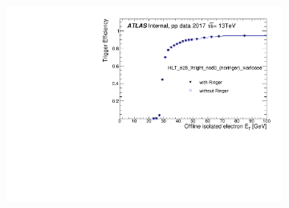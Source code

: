 \begin{figure}[h!tb]
  \begin{center}
  \begin{subfigure}[c]{.58\textwidth}
  \centering
  \includegraphics[width=\textwidth]{sections/04_operation/figures/efficiencies/eff_EGAM1_e28_ringer_and_noringer_2017_after_ts1_HLT_et.pdf}
  \caption{}%


\end{subfigure}
\end{center}
\end{figure}
